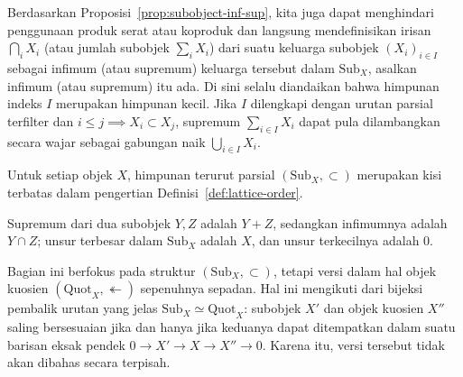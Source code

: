 \begin{konvensi}\label{con:increasing-union}
	Berdasarkan Proposisi~\ref{prop:subobject-inf-sup}, kita juga dapat
	menghindari penggunaan produk serat atau koproduk dan langsung
	mendefinisikan irisan $\bigcap_iX_i$ (atau jumlah subobjek
	$\sum_iX_i$) dari suatu keluarga subobjek $(X_i)_{i\in I}$ sebagai
	infimum (atau supremum) keluarga tersebut dalam $\mathrm{Sub}_X$, asalkan
	infimum (atau supremum) itu ada. Di sini selalu diandaikan bahwa himpunan
	indeks $I$ merupakan himpunan kecil. Jika $I$ dilengkapi dengan urutan
	parsial terfilter dan $i\leq j\implies X_i\subset X_j$, supremum
	$\sum_{i\in I}X_i$ dapat pula dilambangkan secara wajar sebagai
	gabungan naik $\bigcup_{i\in I}X_i$.
\end{konvensi}

\begin{korolari}
	Untuk setiap objek $X$, himpunan terurut parsial
	$(\mathrm{Sub}_X,\subset)$ merupakan kisi terbatas dalam pengertian
	Definisi~\ref{def:lattice-order}.
\end{korolari}
\begin{bukti}
	Supremum dari dua subobjek $Y,Z$ adalah $Y+Z$, sedangkan infimumnya adalah
	$Y\cap Z$; unsur terbesar dalam $\mathrm{Sub}_X$ adalah $X$, dan unsur
	terkecilnya adalah $0$.
\end{bukti}

Bagian ini berfokus pada struktur $(\mathrm{Sub}_X,\subset)$, tetapi versi
dalam hal objek kuosien $(\mathrm{Quot}_X,\twoheadleftarrow)$ sepenuhnya
sepadan. Hal ini mengikuti dari bijeksi pembalik urutan yang jelas
$\mathrm{Sub}_X\simeq\mathrm{Quot}_X$: subobjek $X'$ dan objek kuosien $X''$
saling bersesuaian jika dan hanya jika keduanya dapat ditempatkan dalam suatu
barisan eksak pendek $0\to X'\to X\to X''\to0$. Karena itu, versi tersebut
tidak akan dibahas secara terpisah.


